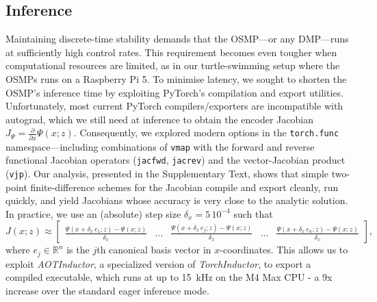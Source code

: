 
\subsection{Inference}
Maintaining discrete-time stability demands that the \gls{OSMP}—or any \gls{DMP}—runs at sufficiently high control rates. This requirement becomes even tougher when computational resources are limited, as in our turtle-swimming setup where the \glspl{OSMP} runs on a Raspberry Pi 5. To minimise latency, we sought to shorten the \gls{OSMP}’s inference time by exploiting PyTorch’s compilation and export utilities. Unfortunately, most current PyTorch compilers/exporters are incompatible with autograd, which we still need at inference to obtain the encoder Jacobian $J_\Psi = \frac{\partial}{\partial x} \Psi(x;z)$. Consequently, we explored modern options in the \texttt{torch.func} namespace—including combinations of \texttt{vmap} with the forward and reverse functional Jacobian operators (\texttt{jacfwd}, \texttt{jacrev}) and the vector-Jacobian product (\texttt{vjp}). Our analysis, presented in the Supplementary Text, shows that simple two-point finite-difference schemes for the Jacobian compile and export cleanly, run quickly, and yield Jacobians whose accuracy is very close to the analytic solution.
In practice, we use an (absolute) step size $\delta_x = 5 \, 10^{-4}$ such that
\begin{equation}
    J(x;z) \approx \begin{bmatrix}
        \frac{\Psi(x+\delta_x \, e_1;z) - \Psi(x;z)}{\delta_x} & \dots &         \frac{\Psi(x+\delta_x \, e_j;z) - \Psi(x;z)}{\delta_x} & \dots & \frac{\Psi(x+\delta_x \, e_n;z) - \Psi(x;z)}{\delta_x}
    \end{bmatrix},
\end{equation}
where $e_j \in \mathbb{R}^n$ is the $j$th canonical basis vector in $x$-coordinates.
This allows us to exploit \emph{AOTInductor}, a specialized version of \emph{TorchInductor}, to export a compiled executable, which runs at up to \SI{15}{kHz} on the M4 Max CPU - a 9x increase over the standard eager inference mode.

